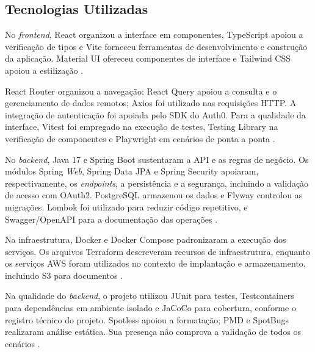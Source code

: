 \subsection{Tecnologias Utilizadas}

No \textit{frontend}, React organizou a interface em componentes, TypeScript apoiou a verificação de tipos e Vite forneceu ferramentas de desenvolvimento e construção da aplicação. Material \ac{UI} ofereceu componentes de interface e Tailwind \ac{CSS} apoiou a estilização \cite{react,typescript,vite,mui,tailwind}.

React Router organizou a navegação; React Query apoiou a consulta e o gerenciamento de dados remotos; Axios foi utilizado nas requisições \ac{HTTP}. A integração de autenticação foi apoiada pelo \ac{SDK} do Auth0. Para a qualidade da interface, Vitest foi empregado na execução de testes, Testing Library na verificação de componentes e Playwright em cenários de ponta a ponta \cite{router,query,axios,auth0,vitest,testinglibrary,playwright}.

No \textit{backend}, Java 17 e Spring Boot sustentaram a \ac{API} e as regras de negócio. Os módulos Spring \textit{Web}, Spring Data \ac{JPA} e Spring Security apoiaram, respectivamente, os \textit{endpoints}, a persistência e a segurança, incluindo a validação de acesso com OAuth2. PostgreSQL armazenou os dados e Flyway controlou as migrações. Lombok foi utilizado para reduzir código repetitivo, e Swagger/OpenAPI para a documentação das operações \cite{spring,jpa,security,postgres,flyway,lombok,vinculohub}.

Na infraestrutura, Docker e Docker Compose padronizaram a execução dos serviços. Os arquivos Terraform descreveram recursos de infraestrutura, enquanto os serviços \ac{AWS} foram utilizados no contexto de implantação e armazenamento, incluindo \ac{S3} para documentos \cite{docker,terraform,aws}.

Na qualidade do \textit{backend}, o projeto utilizou JUnit para testes, Testcontainers para dependências em ambiente isolado e JaCoCo para cobertura, conforme o registro técnico do projeto. Spotless apoiou a formatação; PMD e SpotBugs realizaram análise estática. Sua presença não comprova a validação de todos os cenários \cite{junit,testcontainers,jacoco,spotless,pmd,spotbugs,vinculohub}.
